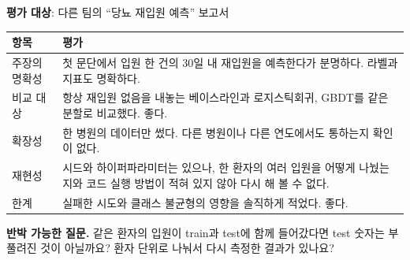 \documentclass[11pt]{article}
\begin{document}


\noindent\textbf{평가 대상}: 다른 팀의 ``당뇨 재입원 예측'' 보고서

\begin{center}\small
\begin{tabular}{@{}p{3.4cm}p{9cm}@{}}\toprule
항목 & 평가 \\\midrule
주장의 명확성 & 첫 문단에서 입원 한 건의 30일 내 재입원을 예측한다가 분명하다. 라벨과 지표도 명확하다. \\
비교 대상 & 항상 재입원 없음을 내놓는 베이스라인과 로지스틱회귀, GBDT를 같은 분할로 비교했다. 좋다. \\
확장성 & 한 병원의 데이터만 썼다. 다른 병원이나 다른 연도에서도 통하는지 확인이 없다. \\
재현성 & 시드와 하이퍼파라미터는 있으나, 한 환자의 여러 입원을 어떻게 나눴는지와 코드 실행 방법이 적혀 있지 않아 다시 해 볼 수 없다. \\
한계 & 실패한 시도와 클래스 불균형의 영향을 솔직하게 적었다. 좋다. \\
\bottomrule\end{tabular}\end{center}

\noindent\textbf{반박 가능한 질문.} 같은 환자의 입원이 train과 test에 함께 들어갔다면 test 숫자는 부풀려진 것이 아닐까요? 환자 단위로 나눠서 다시 측정한 결과가 있나요?
\end{document}
